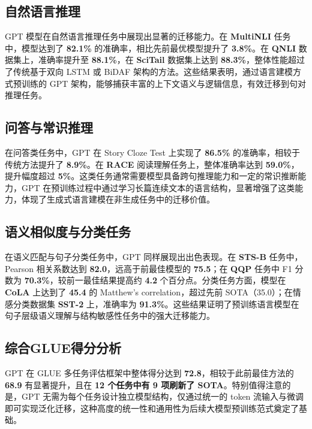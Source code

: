 \documentclass[a4paper,12pt]{article}
\begin{document}
\subsection{自然语言推理}

GPT 模型在自然语言推理任务中展现出显著的迁移能力。在 \textbf{MultiNLI} 任务中，模型达到了 \textbf{82.1\%} 的准确率，相比先前最优模型提升了 \textbf{3.8\%}。在 \textbf{QNLI} 数据集上，准确率提升至 \textbf{88.1\%}，在 \textbf{SciTail} 数据集上达到 \textbf{88.3\%}，整体性能超过了传统基于双向 LSTM 或 BiDAF 架构的方法。这些结果表明，通过语言建模方式预训练的 GPT 架构，能够捕获丰富的上下文语义与逻辑信息，有效迁移到句对推理任务。

\subsection{问答与常识推理}

在问答类任务中，GPT 在 Story Cloze Test 上实现了 \textbf{86.5\%} 的准确率，相较于传统方法提升了 \textbf{8.9\%}。在 \textbf{RACE} 阅读理解任务上，整体准确率达到 \textbf{59.0\%}，提升幅度超过 \textbf{5\%}。这类任务通常需要模型具备跨句推理能力和一定的常识推断能力，GPT 在预训练过程中通过学习长篇连续文本的语言结构，显著增强了这类能力，体现了生成式语言建模在非生成任务中的迁移价值。

\subsection{语义相似度与分类任务}

在语义匹配与句子分类任务中，GPT 同样展现出出色表现。在 \textbf{STS-B} 任务中，Pearson 相关系数达到 \textbf{82.0}，远高于前最佳模型的 \textbf{75.5}；在 \textbf{QQP} 任务中 F1 分数为 \textbf{70.3\%}，较前一最佳结果提高约 \textbf{4.2} 个百分点。分类任务方面，模型在 \textbf{CoLA} 上达到了 \textbf{45.4} 的 Matthew's correlation，超过先前 SOTA（35.0）；在情感分类数据集 \textbf{SST-2} 上，准确率为 \textbf{91.3\%}。这些结果证明了预训练语言模型在句子层级语义理解与结构敏感性任务中的强大迁移能力。

\subsection{综合GLUE得分分析}

GPT 在 GLUE 多任务评估框架中整体得分达到 \textbf{72.8}，相较于此前最佳方法的 \textbf{68.9} 有显著提升，且在 \textbf{12 个任务中有 9 项刷新了 SOTA}。特别值得注意的是，GPT 无需为每个任务设计独立模型结构，仅通过统一的 token 流输入与微调即可实现泛化迁移，这种高度的统一性和通用性为后续大模型预训练范式奠定了基础。
\end{document}
